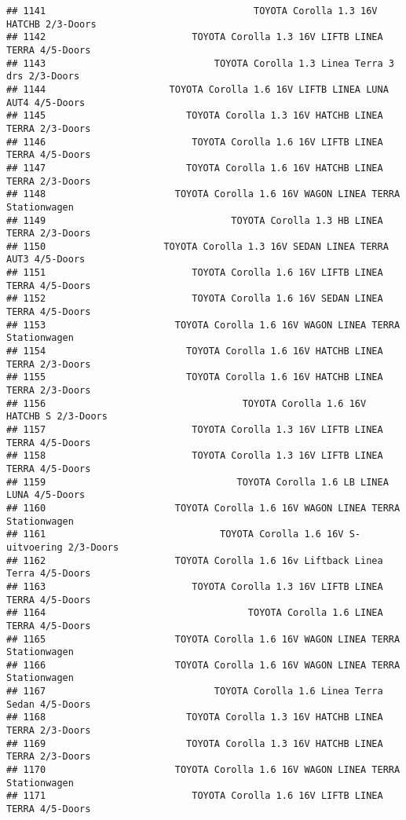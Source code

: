 \documentclass[]{article}
\begin{document}
\begin{verbatim}
## 1141                                     TOYOTA Corolla 1.3 16V HATCHB 2/3-Doors
## 1142                          TOYOTA Corolla 1.3 16V LIFTB LINEA TERRA 4/5-Doors
## 1143                              TOYOTA Corolla 1.3 Linea Terra 3 drs 2/3-Doors
## 1144                      TOYOTA Corolla 1.6 16V LIFTB LINEA LUNA AUT4 4/5-Doors
## 1145                         TOYOTA Corolla 1.3 16V HATCHB LINEA TERRA 2/3-Doors
## 1146                          TOYOTA Corolla 1.6 16V LIFTB LINEA TERRA 4/5-Doors
## 1147                         TOYOTA Corolla 1.6 16V HATCHB LINEA TERRA 2/3-Doors
## 1148                       TOYOTA Corolla 1.6 16V WAGON LINEA TERRA Stationwagen
## 1149                                 TOYOTA Corolla 1.3 HB LINEA TERRA 2/3-Doors
## 1150                     TOYOTA Corolla 1.3 16V SEDAN LINEA TERRA AUT3 4/5-Doors
## 1151                          TOYOTA Corolla 1.6 16V LIFTB LINEA TERRA 4/5-Doors
## 1152                          TOYOTA Corolla 1.6 16V SEDAN LINEA TERRA 4/5-Doors
## 1153                       TOYOTA Corolla 1.6 16V WAGON LINEA TERRA Stationwagen
## 1154                         TOYOTA Corolla 1.6 16V HATCHB LINEA TERRA 2/3-Doors
## 1155                         TOYOTA Corolla 1.6 16V HATCHB LINEA TERRA 2/3-Doors
## 1156                                   TOYOTA Corolla 1.6 16V HATCHB S 2/3-Doors
## 1157                          TOYOTA Corolla 1.3 16V LIFTB LINEA TERRA 4/5-Doors
## 1158                          TOYOTA Corolla 1.3 16V LIFTB LINEA TERRA 4/5-Doors
## 1159                                  TOYOTA Corolla 1.6 LB LINEA LUNA 4/5-Doors
## 1160                       TOYOTA Corolla 1.6 16V WAGON LINEA TERRA Stationwagen
## 1161                               TOYOTA Corolla 1.6 16V S-uitvoering 2/3-Doors
## 1162                       TOYOTA Corolla 1.6 16v Liftback Linea Terra 4/5-Doors
## 1163                          TOYOTA Corolla 1.3 16V LIFTB LINEA TERRA 4/5-Doors
## 1164                                    TOYOTA Corolla 1.6 LINEA TERRA 4/5-Doors
## 1165                       TOYOTA Corolla 1.6 16V WAGON LINEA TERRA Stationwagen
## 1166                       TOYOTA Corolla 1.6 16V WAGON LINEA TERRA Stationwagen
## 1167                              TOYOTA Corolla 1.6 Linea Terra Sedan 4/5-Doors
## 1168                         TOYOTA Corolla 1.3 16V HATCHB LINEA TERRA 2/3-Doors
## 1169                         TOYOTA Corolla 1.3 16V HATCHB LINEA TERRA 2/3-Doors
## 1170                       TOYOTA Corolla 1.6 16V WAGON LINEA TERRA Stationwagen
## 1171                          TOYOTA Corolla 1.6 16V LIFTB LINEA TERRA 4/5-Doors

\end{verbatim}
\end{document}
